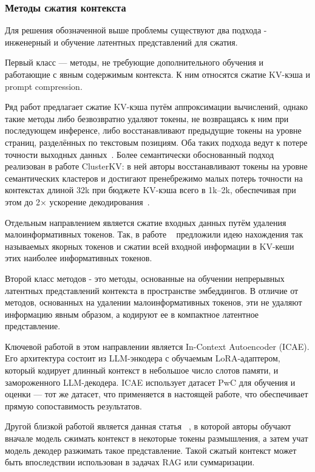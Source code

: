 \documentclass[a4paper,12pt]{extarticle}
\begin{document}
\subsubsection{Методы сжатия контекста}

Для решения обозначенной выше проблемы существуют два подхода - инженерный и обучение латентных представлений
для сжатия. 

Первый класс — методы, не требующие дополнительного обучения и работающие с явным содержимым контекста. К ним относятся сжатие KV-кэша и prompt compression.

Ряд работ предлагает сжатие KV-кэша путём аппроксимации вычислений, однако такие методы либо безвозвратно удаляют токены, не возвращаясь к ним при последующем инференсе, либо восстанавливают предыдущие токены на уровне страниц, разделённых по текстовым позициям. Оба таких подхода ведут к потере точности выходных данных~\cite{cluster_kv}. Более семантически обоснованный подход реализован в работе ClusterKV: в ней авторы восстанавливают токены на уровне семантических кластеров и достигают пренебрежимо малых потерь точности на контекстах длиной 32k при бюджете KV-кэша всего в 1k–2k, обеспечивая при этом до 2× ускорение декодирования~\cite{cluster_kv}.

Отдельным направлением является сжатие входных данных путём удаления малоинформативных токенов. Так, в работе ~\cite{sac} предложили идею нахождения так называемых якорных токенов и сжатии всей входной информации в KV-кеши этих наиболее информативных токенов.

Второй класс методов - это методы, основанные на обучении непрерывных латентных представлений контекста в пространстве эмбеддингов. В отличие от методов, основанных на удалении малоинформативных токенов, эти  не удаляют информацию явным образом, а кодируют ее в компактное латентное представление.  

Ключевой работой в этом направлении является In-Context Autoencoder (ICAE). Его архитектура состоит из LLM-энкодера с обучаемым LoRA-адаптером, который кодирует длинный контекст в небольшое число слотов памяти, и замороженного LLM-декодера. ICAE использует датасет PwC для обучения и оценки — тот же датасет, что применяется в настоящей работе, что обеспечивает прямую сопоставимость результатов.

Другой близкой работой является данная статья ~\cite{ccot}, в которой авторы обучают вначале модель сжимать контекст в некоторые токены размышления, а затем учат модель декодер разжимать такое представление. Такой сжатый контекст может быть впоследствии использован в задачах RAG или суммаризации.
\end{document}
